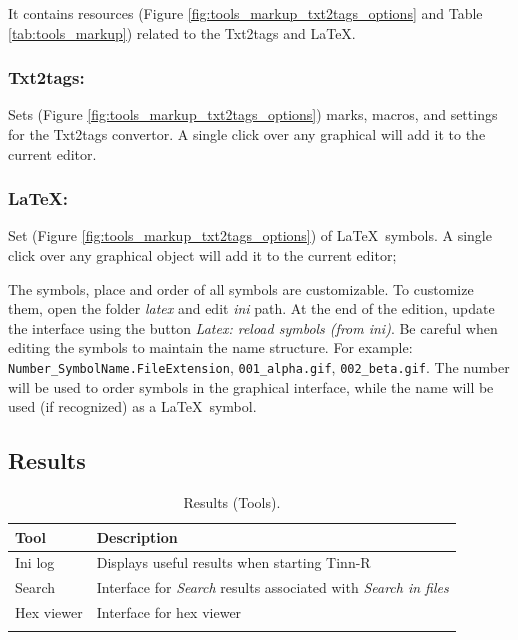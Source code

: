It contains resources
(Figure \ref{fig:tools_markup_txt2tags_options} and
Table \ref{tab:tools_markup})
related to the Txt2tags and \LaTeX.


\subsubsection{Txt2tags:}

Sets
(Figure \ref{fig:tools_markup_txt2tags_options})
marks, macros, and settings for the Txt2tags convertor.
A single click over any graphical will add it to the current editor.


\subsubsection{\LaTeX:}

Set
(Figure \ref{fig:tools_markup_txt2tags_options})
of \LaTeX~symbols. A single click over any graphical object
will add it to the current editor;

The symbols, place and order of all symbols are customizable.
To customize them, open the folder \textit{latex} and edit
\textit{ini} path. At the end of the edition, update the interface
using the button \textit{Latex: reload symbols (from ini)}. Be careful
when editing the symbols to maintain the name structure.
For example: \texttt{Number\_SymbolName.FileExtension},
\texttt{001\_alpha.gif}, \texttt{002\_beta.gif}. The number
will be used to order symbols in the graphical interface,
while the name will be used (if recognized) as a \LaTeX~symbol.


\hypertarget{working_tools_results}{}
\subsection{Results}

\begin{table}
  \begin{footnotesize}
    \begin{tabularx}{\textwidth}{>{\hsize=0.3\hsize}X>{\hsize=0.7\hsize}X}\\
      \hline
      \textbf{Tool} & \textbf{Description} \\
      \hline
      Ini log & Displays useful results when starting Tinn-R \\
      Search & Interface for \textit{Search} results associated with \textit{Search in files} \\
      Hex viewer & Interface for hex viewer \\
      \hline
      \\
    \end{tabularx}
  \end{footnotesize}
  \caption{Results (Tools).}
  \label{tab:tools_results}
\end{table}


